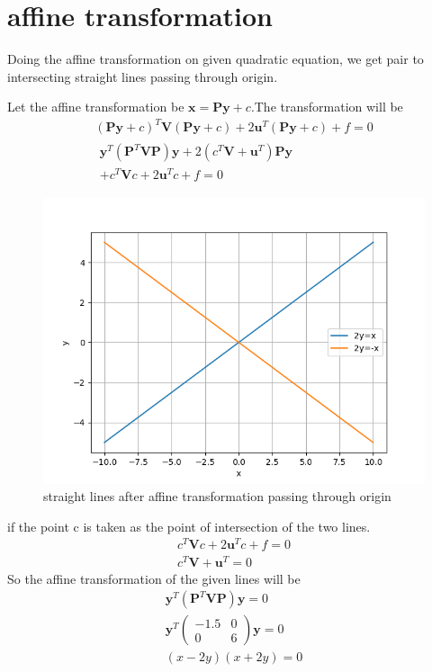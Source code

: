 \documentclass[journal,12pt,twocolumn]{IEEEtran}
\providecommand{\brak}[1]{\ensuremath{\left(#1\right)}}
\newcommand{\myvec}[1]{\ensuremath{\begin{pmatrix}#1\end{pmatrix}}}
\numberwithin{equation}{subsection}
\let\vec\mathbf
\begin{document}
\section{affine transformation}
Doing the affine transformation on given quadratic equation, we get pair to intersecting straight lines passing through origin.\par
Let the affine transformation be $\vec{x}=\vec{P}\vec{y}+c$.The transformation will be
\begin{align}
    \brak{\vec{P}\vec{y}+c}^T\vec{V}\brak{\vec{P}\vec{y}+c}+2\vec{u}^T\brak{\vec{P}\vec{y}+c}+f=0\\
    \begin{multlined}
        \vec{y}^T\brak{\vec{P}^T\vec{V}\vec{P}}\vec{y}+2\brak{c^T\vec{V}+\vec{u}^T}\vec{P}\vec{y}\\
        +c^T\vec{V}c+2\vec{u}^Tc+f=0
    \end{multlined}\label{eq:5}
\end{align}
\begin{figure}[t]
    \centering
    \includegraphics[width=\columnwidth]{Fig1_a5.png}
    \caption{straight lines after affine transformation passing through origin}
    \label{fig:1}
\end{figure}
if the point c is taken as the point of intersection of the two lines.
\begin{align}
    c^T\vec{V}c+2\vec{u}^Tc+f=0\\
    c^T\vec{V}+\vec{u}^T=0
\end{align}
So the affine transformation of the given lines will be
\begin{align}
    \vec{y}^T\brak{\vec{P}^T\vec{V}\vec{P}}\vec{y}=0\\
    \vec{y}^T\myvec{-1.5&0\\0&6}\vec{y}=0\\
    \brak{x-2y}\brak{x+2y}=0
\end{align}
\end{document}
